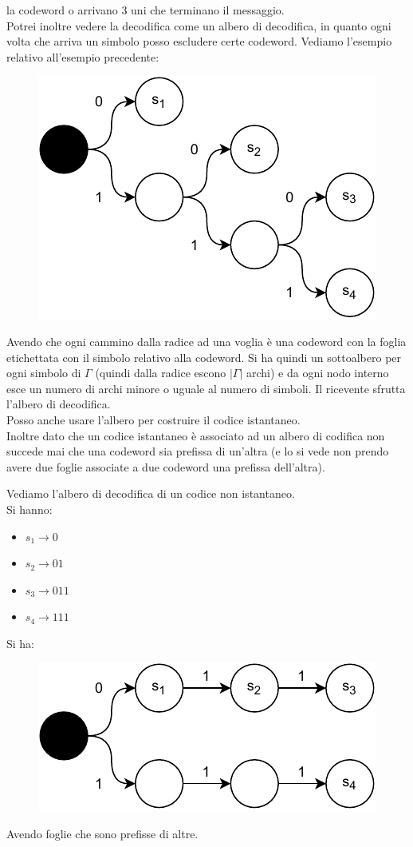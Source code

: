 \documentclass[a4paper,12pt, oneside]{book}
\begin{document}
la codeword o arrivano 3 uni che terminano il messaggio.\\
Potrei inoltre vedere la decodifica come un albero di
decodifica, in quanto ogni volta che arriva un simbolo posso escludere certe
codeword.
\newpage
Vediamo l'esempio relativo all'esempio precedente:
\begin{figure}[H]
  \centering
  \includegraphics[scale = 0.8]{img/ct.pdf}
\end{figure}
Avendo che ogni cammino dalla radice ad una voglia è una codeword con la
foglia etichettata con il simbolo relativo alla codeword. Si ha quindi un
sottoalbero per ogni simbolo di $\Gamma$ (quindi dalla radice escono
$|\Gamma|$ archi) e da ogni nodo interno esce un numero
di archi minore o uguale al numero di simboli. Il ricevente sfrutta l'albero di
decodifica.\\ 
Posso anche usare l'albero per costruire il codice istantaneo.\\
Inoltre dato che un codice istantaneo è associato ad un albero di codifica non
succede mai che una codeword sia prefissa di un'altra (e lo si vede non prendo
avere due foglie associate a due codeword una prefissa dell'altra).
\begin{esempio}
  Vediamo l'albero di decodifica di un codice non istantaneo.\\
  Si hanno:
  \begin{itemize}
    \item $s_1\to 0$
    \item $s_2\to 01$
    \item $s_3\to 011$
    \item $s_4\to 111$
  \end{itemize}
  Si ha:
  \begin{figure}[H]
    \centering
    \includegraphics[scale = 0.8]{img/ct2.pdf}
  \end{figure}
  Avendo foglie che sono prefisse di altre.
\end{esempio}
\end{document}
